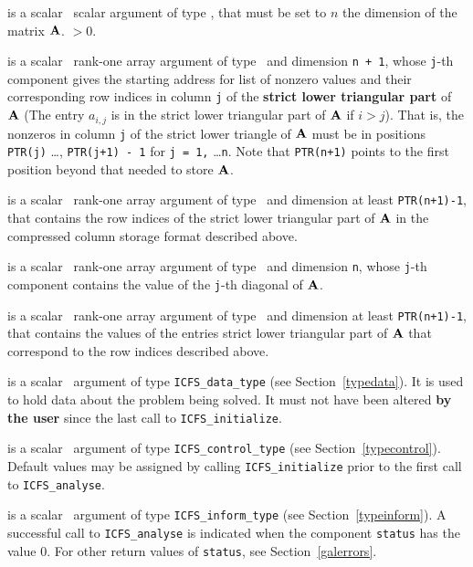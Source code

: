 \documentclass{galahad}
\newcommand{\packagename}{ICFS}
\begin{document}
\vspace*{-2mm}
\begin{description}
is a scalar \intentin\ scalar argument of type \integer, that must be
set to $n$ the dimension of the matrix ${\mathbf{A}}$.
 $> 0$.

 is a scalar \intentin\ rank-one array argument of type
\integer\ and dimension {\tt n + 1}, whose {\tt j}-th component
gives the starting address for list of nonzero values and their
corresponding row  indices in column {\tt j} of the
{\bf strict lower triangular part} of ${\mathbf{A}}$ (The entry $a_{i,j}$ is in
the strict lower triangular part of ${\mathbf{A}}$ if $i > j$).
That is, the nonzeros in column {\tt j} of the strict lower triangle of
${\mathbf{A}}$ must be in positions {\tt PTR(j)} \ldots, {\tt PTR(j+1) - 1} for
{\tt j = 1,} \ldots {\tt n}.
Note that {\tt PTR(n+1)} points to the first position beyond that needed
to store ${\mathbf{A}}$.

 is a scalar \intentin\ rank-one array argument of type
\integer\ and dimension at least {\tt  PTR(n+1)-1},
that contains the row indices of the strict lower triangular part of ${\mathbf{A}}$
in the compressed column storage format described above.

 is a scalar \intentin\ rank-one array argument of type
\realdp\ and dimension {\tt n}, whose {\tt j}-th component
contains the value of the {\tt j}-th diagonal of ${\mathbf{A}}$.

 is a scalar \intentin\ rank-one array argument of type
\realdp\ and dimension at least {\tt  PTR(n+1)-1},
that contains the values of the entries strict lower triangular part of ${\mathbf{A}}$
that correspond to the row indices described above.

 is a scalar \intentinout\ argument of type
{\tt \packagename\_data\_type}
(see Section~\ref{typedata}). It is used to hold data about the problem being
solved. It must not have been altered {\bf by the user} since the last call to
{\tt \packagename\_initialize}.

 is a scalar \intentin\ argument of type
{\tt \packagename\_control\_type}
(see Section~\ref{typecontrol}). Default values may be assigned by calling
{\tt \packagename\_initialize} prior to the first call to
{\tt \packagename\_analyse}.

 is a scalar \intentinout\ argument of type
{\tt \packagename\_inform\_type}
(see Section~\ref{typeinform}).
A successful call to
{\tt \packagename\_analyse}
is indicated when the  component {\tt status} has the value 0.
For other return values of {\tt status}, see Section~\ref{galerrors}.

\end{description}
\end{document}
